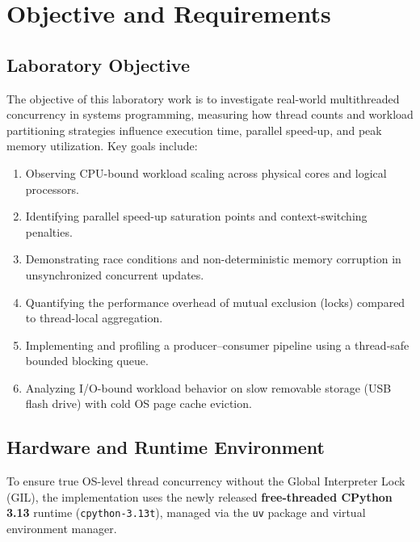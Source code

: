 \documentclass{labreport}
\begin{document}

\tableofcontents
\newpage

\section{Objective and Requirements}

\subsection{Laboratory Objective}
The objective of this laboratory work is to investigate real-world multithreaded concurrency in systems programming, measuring how thread counts and workload partitioning strategies influence execution time, parallel speed-up, and peak memory utilization. Key goals include:
\begin{enumerate}
    \item Observing CPU-bound workload scaling across physical cores and logical processors.
    \item Identifying parallel speed-up saturation points and context-switching penalties.
    \item Demonstrating race conditions and non-deterministic memory corruption in unsynchronized concurrent updates.
    \item Quantifying the performance overhead of mutual exclusion (locks) compared to thread-local aggregation.
    \item Implementing and profiling a producer--consumer pipeline using a thread-safe bounded blocking queue.
    \item Analyzing I/O-bound workload behavior on slow removable storage (USB flash drive) with cold OS page cache eviction.
\end{enumerate}

\subsection{Hardware and Runtime Environment}
To ensure true OS-level thread concurrency without the Global Interpreter Lock (GIL), the implementation uses the newly released \textbf{free-threaded CPython 3.13} runtime (\texttt{cpython-3.13t}), managed via the \texttt{uv} package and virtual environment manager.
\end{document}
